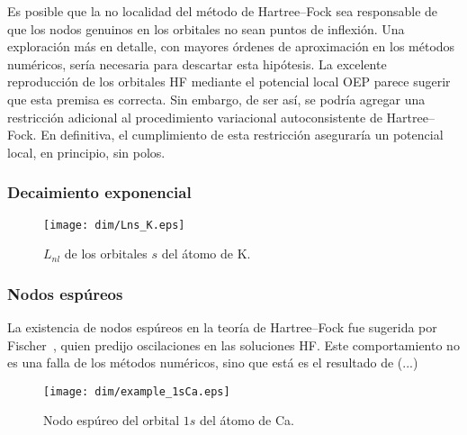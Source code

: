 Es posible que la no localidad del método de Hartree--Fock sea 
responsable de que los nodos genuinos en los orbitales no sean puntos de 
inflexión. Una exploración más en detalle, con mayores órdenes de 
aproximación en los métodos numéricos, sería necesaria para descartar 
esta hipótesis. La excelente reproducción de los orbitales HF mediante 
el potencial local OEP parece sugerir que esta premisa es correcta. Sin 
embargo, de ser así, se podría agregar una restricción adicional al 
procedimiento variacional autoconsistente de Hartree--Fock. En 
definitiva, el cumplimiento de esta restricción aseguraría un potencial 
local, en principio, sin polos.

\subsubsection{Decaimiento exponencial}


\begin{figure}
\centering
\texttt{[image: dim/Lns\_K.eps]} 
\vspace{-0.45cm}
\caption[$L_{nl}$.]
{$L_{nl}$ de los orbitales $s$ del átomo de K.}
\label{fig:dr2sK}
\end{figure}

\subsubsection{Nodos espúreos}

La existencia de nodos espúreos en la teoría de Hartree--Fock fue 
sugerida por Fischer~\cite{FroeseFischer:97}, quien predijo oscilaciones 
en las soluciones HF. Este comportamiento no es una falla de los métodos 
numéricos, sino que está es el resultado de (...)


\begin{figure}
\centering
\texttt{[image: dim/example\_1sCa.eps]} 
\vspace{-0.45cm}
\caption[Nodos espúreos.]
{Nodo espúreo del orbital $1s$ del átomo de Ca.}
\label{fig:nodoespureo1sCa}
\end{figure}




